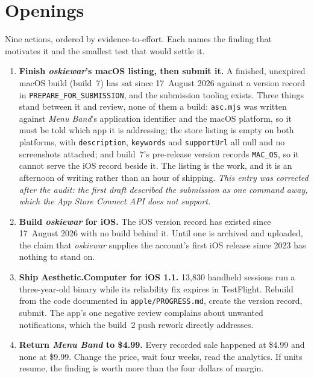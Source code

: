 \documentclass[10pt,letterpaper,twocolumn]{article}
\newcommand{\acdot}{{\color{acpink}.}}
\newcommand{\ac}{Aesthetic{\acdot}Computer}
\begin{document}
\section{Openings}
\label{sec:openings}

Nine actions, ordered by evidence-to-effort. Each names the finding that
motivates it and the smallest test that would settle it.

\begin{enumerate}
\item \textbf{Finish \emph{oskiewar}'s macOS listing, then submit it.}
A finished, unexpired macOS build (build~7) has sat since 17~August 2026
against a version record in \texttt{PREPARE\_FOR\_SUBMISSION}, and the
submission tooling exists. Three things stand between it and review,
none of them a build: \texttt{asc.mjs} was written against \emph{Menu
Band}'s application identifier and the macOS platform, so it must be
told which app it is addressing; the store listing is empty on both
platforms, with \texttt{description}, \texttt{keywords} and
\texttt{supportUrl} all null and no screenshots attached; and build~7's
pre-release version records \texttt{MAC\_OS}, so it cannot serve the
iOS record beside it. The listing is the work, and it is an afternoon
of writing rather than an hour of shipping. \emph{This entry was
corrected after the audit: the first draft described the submission as
one command away, which the App Store Connect API does not support.}

\item \textbf{Build \emph{oskiewar} for iOS.} The iOS version record
has existed since 17~August 2026 with no build behind it. Until one is
archived and uploaded, the claim that \emph{oskiewar} supplies the
account's first iOS release since 2023 has nothing to stand on.

\item \textbf{Ship \ac{} for iOS 1.1.} 13,830 handheld
sessions run a three-year-old binary while its reliability fix expires
in TestFlight. Rebuild from the code documented in
\texttt{apple/PROGRESS.md}, create the version record, submit. The
app's one negative review complains about unwanted notifications, which
the build~2 push rework directly addresses.

\item \textbf{Return \emph{Menu Band} to \$4.99.} Every recorded sale
happened at \$4.99 and none at \$9.99. Change the price, wait four
weeks, read the analytics. If units resume, the finding is worth more
than the four dollars of margin.


\end{enumerate}
\end{document}
